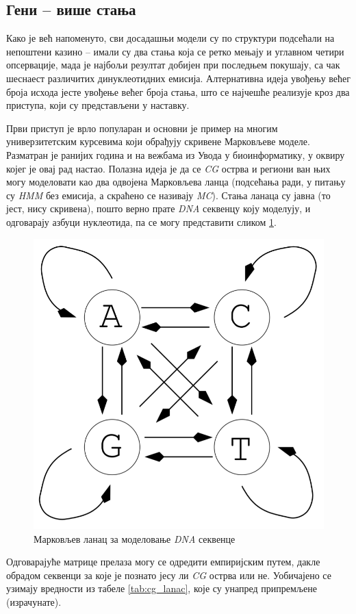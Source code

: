 \documentclass[12pt,oneside]{memoir}
\begin{document}
\begin{CJK}{UTF8}{ipxm}
\section{Гени -- више стања}
Како је већ напоменуто, сви досадашњи модели су по структури подсећали на непоштени казино -- имали су два стања која се ретко мењају и углавном четири опсервације, мада је најбољи резултат добијен при последњем покушају, са чак шеснаест различитих динуклеотидних емисија. Алтернативна идеја увођењу већег броја исхода јесте увођење већег броја стања, што се најчешће реализује кроз два приступа, који су представљени у наставку.

Први приступ је врло популаран и основни је пример на многим универзитетским курсевима који обрађују скривене Марковљеве моделе\cite{holmes2012, huson2020, kellis2021, shamir2009}. Разматран је ранијих година и на вежбама из Увода у биоинформатику, у оквиру којег је овај рад настао. Полазна идеја је да се \textit{CG} острва и региони ван њих могу моделовати као два одвојена Марковљева ланца (подсећања ради, у питању су \textit{HMM} без емисија, а скраћено се називају \textit{MC}). Стања ланаца су јавна (то јест, нису скривена), пошто верно прате \textit{DNA} секвенцу коју моделују, и одговарају азбуци нуклеотида, па се могу представити сликом \ref{fig:cg_lanac}.

\begin{figure}[!ht]
  \centering
  \includegraphics[width=.5\textwidth]{cg_lanac.png}
  \caption{Марковљев ланац за моделовање \textit{DNA} секвенце\cite{huson2020}}
  \label{fig:cg_lanac}
\end{figure}

Одговарајуће матрице прелаза могу се одредити емпиријским путем, дакле обрадом секвенци за које је познато јесу ли \textit{CG} острва или не. Уобичајено се узимају вредности из табеле \ref{tab:cg_lanac}, које су унапред припремљене (израчунате).


\end{CJK}
\end{document}
